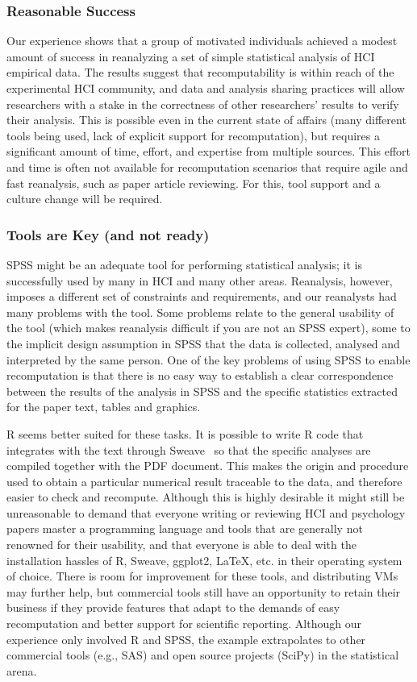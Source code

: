 \subsubsection{Reasonable Success}
Our experience shows that a group of motivated individuals achieved a modest amount of success in reanalyzing a set of simple statistical analysis of HCI empirical data. The results suggest that recomputability is within reach of the experimental HCI community, and data and analysis sharing practices will allow researchers with a stake in the correctness of other researchers' results to verify their analysis. This is possible even in the current state of affairs (many different tools being used, lack of explicit support for recomputation), but requires a significant amount of time, effort, and expertise from multiple sources. This effort and time is often not available for recomputation scenarios that require agile and fast reanalysis, such as paper article reviewing. For this, tool support and a culture change will be required. 

\subsubsection{Tools are Key (and not ready)}
SPSS might be an adequate tool for performing statistical analysis; it is successfully used by many in HCI and many other areas. Reanalysis, however, imposes a different set of constraints and requirements, and our reanalysts had many problems with the tool. Some problems relate to the general usability of the tool (which makes reanalysis difficult if you are not an SPSS expert), some to the implicit design assumption in SPSS that the data is collected, analysed and interpreted by the same person. One of the key problems of using SPSS to enable recomputation is that there is no easy way to establish a clear correspondence between the results of the analysis in SPSS and the specific statistics extracted for the paper text, tables and graphics. 

R seems better suited for these tasks. It is possible to write R code that integrates with the text through Sweave~\cite{lmucs-papers:Leisch:2002} so that the specific analyses are compiled together with the PDF document. This makes the origin and procedure used to obtain a particular numerical result traceable to the data, and therefore easier to check and recompute. Although this is highly desirable it might still be unreasonable to demand that everyone writing or reviewing HCI and psychology papers master a programming language and tools that are generally not renowned for their usability, and that everyone is able to deal with the installation hassles of R, Sweave, ggplot2, \LaTeX, etc. in their operating system of choice. There is room for improvement for these tools, and distributing VMs may further help, but commercial tools still have an opportunity to retain their business if they provide features that adapt to the demands of easy recomputation and better support for scientific reporting. Although our experience only involved R and SPSS, the example extrapolates to other commercial tools (e.g., SAS) and open source projects (SciPy) in the statistical arena.

